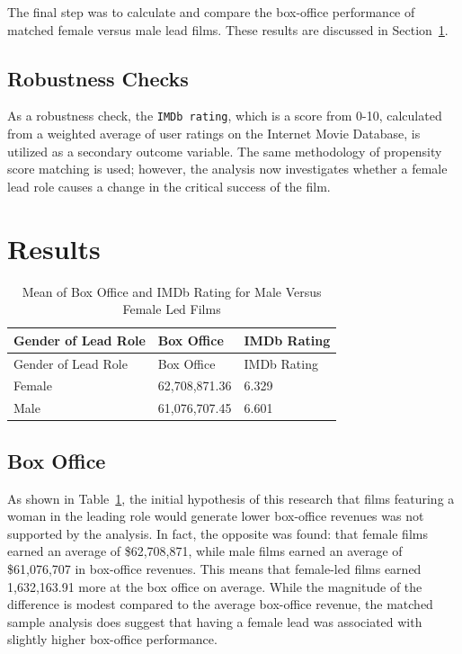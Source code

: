 \documentclass[
]{agujournal2019}
\begin{document}
The final step was to calculate and compare the box-office performance
of matched female versus male lead films. These results are discussed in
Section~\ref{sec-results}.

\subsection{Robustness Checks}\label{robustness-checks}

As a robustness check, the \texttt{IMDb\ rating}, which is a score from
0-10, calculated from a weighted average of user ratings on the Internet
Movie Database, is utilized as a secondary outcome variable. The same
methodology of propensity score matching is used; however, the analysis
now investigates whether a female lead role causes a change in the
critical success of the film.

\section{Results}\label{sec-results}

\begin{longtable}[]{@{}lll@{}}
\caption{Mean of Box Office and IMDb Rating for Male Versus Female Led
Films}\label{tbl-10}\tabularnewline
\toprule\noalign{}
Gender of Lead Role & Box Office & IMDb Rating \\
\midrule\noalign{}
\endfirsthead
\toprule\noalign{}
Gender of Lead Role & Box Office & IMDb Rating \\
\midrule\noalign{}
\endhead
\bottomrule\noalign{}
\endlastfoot
Female & 62,708,871.36 & 6.329 \\
Male & 61,076,707.45 & 6.601 \\
\end{longtable}

\subsection{Box Office}\label{box-office}

As shown in Table~\ref{tbl-10}, the initial hypothesis of this research
that films featuring a woman in the leading role would generate lower
box-office revenues was not supported by the analysis. In fact, the
opposite was found: that female films earned an average of \$62,708,871,
while male films earned an average of \$61,076,707 in box-office
revenues. This means that female-led films earned 1,632,163.91 more at
the box office on average. While the magnitude of the difference is
modest compared to the average box-office revenue, the matched sample
analysis does suggest that having a female lead was associated with
slightly higher box-office performance.
\end{document}
